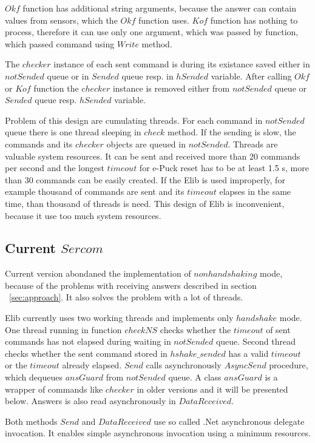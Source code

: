 	$Okf$ function has additional string arguments, because the answer can contain values from
	sensors, which the $Okf$ function uses.
	$Kof$ function has nothing to process, therefore it can use only one argument, which
	was passed by function, which passed command using $Write$ method.

	The $checker$ instance of each sent command is during its existance saved either in $notSended$ queue or in $Sended$ queue resp. in
	$hSended$ variable.
	After calling $Okf$ or $Kof$ function the $checker$ instance is removed either from $notSended$ queue
	or $Sended$ queue resp. $hSended$ variable. 

	Problem of this design are cumulating threads. For each command in $notSended$ queue there is 
	one thread sleeping in $check$ method. If the sending is slow, the commands and its $checker$ objects are queued in
	$notSended$. Threads are valuable system resources. 
	It can be sent and received more than 20 commands per second and the longest $timeout$ for 
	e-Puck reset has to be at least 1.5 s, more than 30 commands can be easily created.
	If the Elib is used improperly, for example thousand of commands are sent and its $timeout$ elapses
	in the same time, than thousand of threads is need. This design of Elib is inconvenient, because
	it use too much system resources.
\subsection*{Current $Sercom$}\label{sec:current}
	Current version abondaned the implementation of $nonhandshaking$ mode, 
	because of the problems with receiving answers described 
	in section ~\ref{sec:approach}.
	It also solves the problem with	a lot of threads. 
	
	Elib currently uses two working threads and implements only $handshake$ mode.
	One thread running in function $checkNS$ checks whether the $timeout$ of sent commands
	has not elapsed during waiting in $notSended$ queue. Second thread checks whether the sent command
	stored in $hshake\_sended$ has a valid $timeout$ or the $timeout$ already elapsed.
	$Send$ calls asynchronously $AsyncSend$ procedure, which dequeues $ansGuard$ from $notSended$ queue.
	A class $ansGuard$ is a wrapper of commands like $checker$ in older versions and it will be presented below.
	Answers is also read asynchronously in $DataReceived$.

	Both methods $Send$ and $DataReceived$ use so called .Net asynchronous
	delegate invocation. It enables simple asynchronous invocation using a minimum resources.

